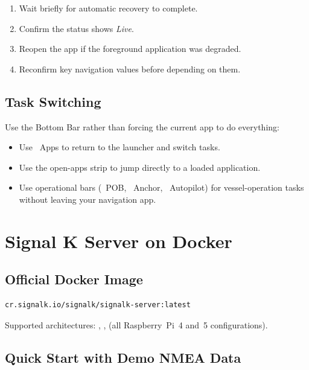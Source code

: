 \begin{enumerate}
  \item Wait briefly for automatic recovery to complete.
  \item Confirm the status shows \textit{Live}.
  \item Reopen the app if the foreground application was degraded.
  \item Reconfirm key navigation values before depending on them.
\end{enumerate}

\section{Task Switching}

Use the Bottom Bar rather than forcing the current app to do everything:

\begin{itemize}
  \item Use ~Apps to return to the launcher and switch tasks.
  \item Use the open-apps strip to jump directly to a loaded application.
  \item Use operational bars (~POB, ~Anchor,
        ~Autopilot) for vessel-operation tasks
        without leaving your navigation app.
\end{itemize}

\chapter{Signal K Server on Docker}
\label{ch:docker}

\section{Official Docker Image}

\begin{lstlisting}
cr.signalk.io/signalk/signalk-server:latest
\end{lstlisting}

Supported architectures: , ,
 (all Raspberry~Pi~4 and~5 configurations).

\section{Quick Start with Demo NMEA Data}

